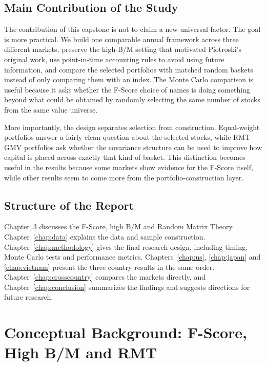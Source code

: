 \documentclass[11pt,a4paper]{report}
\numberwithin{figure}{chapter}
\numberwithin{table}{chapter}
\numberwithin{equation}{chapter}
\begin{document}
\section{Main Contribution of the Study}

The contribution of this capstone is not to claim a new universal factor. The goal is more practical. We build one comparable annual framework across three different markets, preserve the high-B/M setting that motivated Piotroski's original work, use point-in-time accounting rules to avoid using future information, and compare the selected portfolios with matched random baskets instead of only comparing them with an index. The Monte Carlo comparison is useful because it asks whether the F-Score choice of names is doing something beyond what could be obtained by randomly selecting the same number of stocks from the same value universe.

More importantly, the design separates selection from construction. Equal-weight portfolios answer a fairly clean question about the selected stocks, while RMT-GMV portfolios ask whether the covariance structure can be used to improve how capital is placed across exactly that kind of basket. This distinction becomes useful in the results because some markets show evidence for the F-Score itself, while other results seem to come more from the portfolio-construction layer.

\section{Structure of the Report}

Chapter~\ref{chap:concepts} discusses the F-Score, high B/M and Random Matrix Theory. Chapter~\ref{chap:data} explains the data and sample construction. Chapter~\ref{chap:methodology} gives the final research design, including timing, Monte Carlo tests and performance metrics. Chapters~\ref{chap:us}, \ref{chap:japan} and \ref{chap:vietnam} present the three country results in the same order. Chapter~\ref{chap:crosscountry} compares the markets directly, and Chapter~\ref{chap:conclusion} summarizes the findings and suggests directions for future research.

\chapter{Conceptual Background: F-Score, High B/M and RMT}
\label{chap:concepts}
\end{document}
